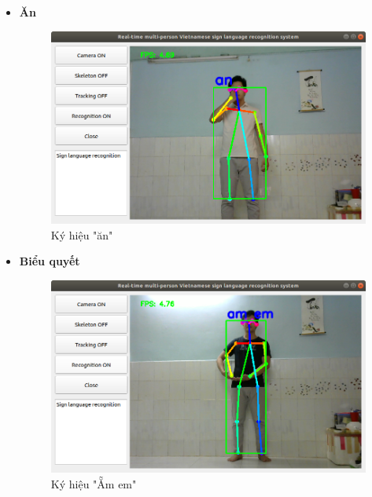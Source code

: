 \documentclass[12pt,a4paper,oneside]{book}
\numberwithin{equation}{chapter} %
\numberwithin{figure}{chapter} %
\numberwithin{table}{chapter} %
\begin{document}
\begin{itemize}
\item \textbf{Ăn}
\FloatBarrier
\begin{figure}[htp]
\begin{center}
\includegraphics[scale=0.4]{kq/an.png}
\end{center}
\caption{Ký hiệu "ăn"}
\end{figure}
\FloatBarrier

\thispagestyle{phuluc}
\pagebreak
\item \textbf{Biểu quyết}
\FloatBarrier
\begin{figure}[htp]
\begin{center}
\includegraphics[scale=0.4]{kq/am_em.png}
\end{center}
\caption{Ký hiệu "Ẵm em"}
\end{figure}
\FloatBarrier


\end{itemize}
\end{document}

